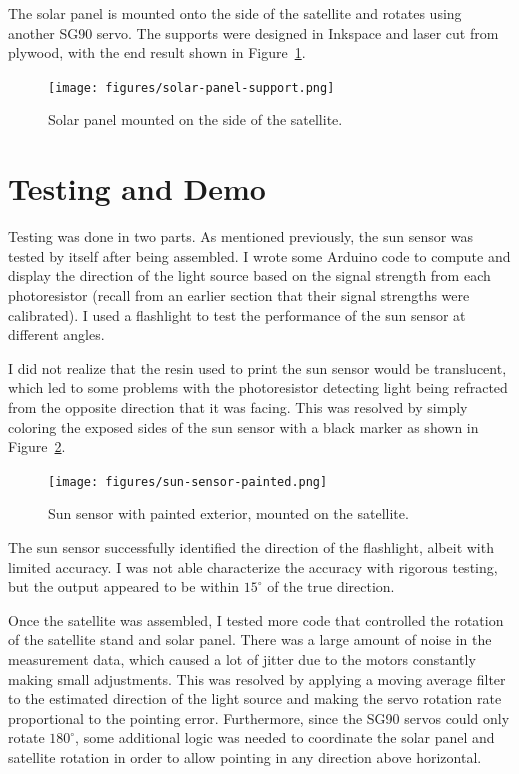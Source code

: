 The solar panel is mounted onto the side of the satellite and rotates using another SG90 servo. The supports were designed in Inkspace and laser cut from plywood, with the end result shown in Figure~\ref{fig:solar-panel-support}.
\begin{figure}[!ht]
	\centering
	\texttt{[image: figures/solar-panel-support.png]}
	\caption{Solar panel mounted on the side of the satellite.}
	\label{fig:solar-panel-support}
\end{figure}




\FloatBarrier
\section{Testing and Demo}
\label{sec:testing}

Testing was done in two parts. As mentioned previously, the sun sensor was tested by itself after being assembled. I wrote some Arduino code to compute and display the direction of the light source based on the signal strength from each photoresistor (recall from an earlier section that their signal strengths were calibrated). I used a flashlight to test the performance of the sun sensor at different angles. 

I did not realize that the resin used to print the sun sensor would be translucent, which led to some problems with the photoresistor detecting light being refracted from the opposite direction that it was facing. This was resolved by simply coloring the exposed sides of the sun sensor with a black marker as shown in Figure~\ref{fig:sun-sensor-painted}. 
\begin{figure}[!ht]
	\centering
	\texttt{[image: figures/sun-sensor-painted.png]}
	\caption{Sun sensor with painted exterior, mounted on the satellite.}
	\label{fig:sun-sensor-painted}
\end{figure}

The sun sensor successfully identified the direction of the flashlight, albeit with limited accuracy. I was not able characterize the accuracy with rigorous testing, but the output appeared to be within $15^\circ$ of the true direction. 

Once the satellite was assembled, I tested more code that controlled the rotation of the satellite stand and solar panel. There was a large amount of noise in the measurement data, which caused a lot of jitter due to the motors constantly making small adjustments. This was resolved by applying a moving average filter to the estimated direction of the light source and making the servo rotation rate proportional to the pointing error. Furthermore, since the SG90 servos could only rotate $180^\circ$, some additional logic was needed to coordinate the solar panel and satellite rotation in order to allow pointing in any direction above horizontal. 

